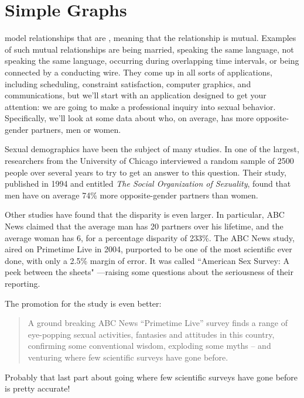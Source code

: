 \chapter{Simple Graphs}\label{simple_graphs_chap}

 model relationships that are
\emph{}, meaning that the relationship is mutual.
Examples of such mutual relationships are being married, speaking the
same language, not speaking the same language, occurring during
overlapping time intervals, or being connected by a conducting wire.
They come up in all sorts of applications, including scheduling,
constraint satisfaction, computer graphics, and communications, but
we'll start with an application designed to get your attention: we are
going to make a professional inquiry into sexual behavior.  Specifically,
we'll look at some data about who, on average, has more
opposite-gender partners, men or women.

\iffalse
An example is shown in
Figure~\ref{fig:graph-example}.  The dots are called \emph{nodes} (or
\emph{vertices}) and the lines are called \emph{edges}.
\fi

Sexual demographics have been the subject of many studies.  In one of
the largest, researchers from the University of Chicago
interviewed a random sample of 2500 people over several years to try
to get an answer to this question.  Their study, published in 1994 and
entitled \emph{The Social Organization of Sexuality}, found that men
have on average 74\% more opposite-gender partners than women.

Other studies have found that the disparity is even larger.  In
particular, ABC News claimed that the average man has 20 partners over his
lifetime, and the average woman has 6, for a percentage disparity of
233\%.  The ABC News study, aired on Primetime Live in 2004, purported to
be one of the most scientific ever done, with only a 2.5\% margin of
error.  It was called ``American Sex Survey: A peek between the sheets"
---raising some questions about the seriousness of their reporting.
\begin{editingnotes}
The promotion for the study is even better:
\begin{quote} 
A ground breaking ABC News ``Primetime Live'' survey finds a range of
eye-popping sexual activities, fantasies and attitudes in this country,
confirming some conventional wisdom, exploding some myths -- and venturing
where few scientific surveys have gone before.
\end{quote}
Probably that last part about going where few scientific surveys have gone
before is pretty accurate!
\end{editingnotes}

